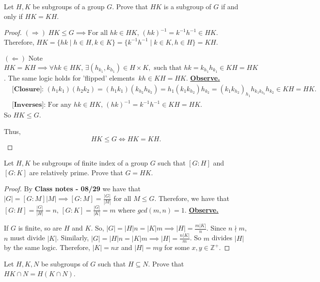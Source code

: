 \documentclass[addpoints,10pt]{exam}
\theoremstyle{plain}
\theoremstyle{definition}
\newtheorem{prob}[thm]{Problem}
\theoremstyle{plain}
\theoremstyle{plain}
\theoremstyle{definition}
\let\oldprob\prob
\let\endoldprob\endprob
\renewenvironment{prob}
  {\begin{singlespace}\oldprob}
  {\endoldprob\end{singlespace}}
\newcommand{\belowtitle}{\leavevmode\newline}
\newcommand{\Observe}{\underline{\textbf{Observe.}}}
\newcommand{\IF}{\mathbf{(\Rightarrow)}}
\newcommand{\FI}{\mathbf{(\Leftarrow)}}
\newcommand{\ZZ}{\ensuremath{\mathbb{Z}}}
\begin{document}
\begin{prob}
Let $H,K$ be subgroups of a group $G$. Prove that $HK$ is a subgroup of $G$ if and only if $HK=KH$.
\end{prob}

\begin{proof}\belowtitle
  $\IF\;HK\leq G\implies\text{For all }hk\in HK$, $(hk)^{-1}=k^{-1}h^{-1}\in HK$. Therefore, $HK=\{hk\mid h\in H, k\in K\}=\{k^{-1}h^{-1}\mid k\in K,h\in H\}=KH$.

  $\FI$ Note $HK=KH\implies \forall hk\in HK,\,\exists (h_{k_{1}},k_{h_{1}})\in H\times K, \text{ such that }hk=k_{h_{1}}h_{k_{1}}\in KH=HK$. The same logic holds for 'flipped' elements$\;\;kh\in KH=HK$. \Observe
  \begin{align*}
    &\textbf{[Closure]: } (h_{1}k_{1})(h_{2}k_{2})=(h_{1}k_{1})(k_{h_{2}}h_{k_{2}})=h_{1}(k_{1}k_{h_{2}})h_{k_{2}}=(k_{1}k_{h_{2}})_{h_{1}}h_{k_{1}k_{h_{2}}}h_{k_{2}}\in KH=HK.\\
    &\textbf{[Inverses]: }\text{For any }hk\in HK,\,(hk)^{-1}=k^{-1}h^{-1}\in KH=HK.
  \end{align*}
  So $HK\leq G$.

  Thus,
  $$HK\leq G\iff HK=KH.$$
\end{proof}
\newpage
\begin{prob}
Let $H,K$ be subgroups of finite index of a group $G$ such that $[G:H]$ and $[G:K]$ are relatively prime. Prove that $G=HK$.
\end{prob}

\begin{proof}
By \textbf{Class notes - 08/29} we have that $|G|=[G:M]|M|\implies [G:M]=\frac{|G|}{|M|}$ for all $M\leq G$. Therefore, we have that $[G:H]=\frac{|G|}{|H|}=n,\,[G:K]=\frac{|G|}{|K|}=m$ where $gcd(m,n)=1$. \Observe

If $G$ is finite, so are $H$ and $K$. So, $|G|=|H|n=|K|m\implies |H|=\frac{m|K|}{n}$. Since $n\nmid m$, $n$ must divide $|K|$. Similarly, $|G|=|H|n=|K|m\implies |H|=\frac{n|K|}{m}$. So $m$ divides $|H|$ by the same logic. Therefore, $|K|=nx$ and $|H|=my$ for some $x,y\in \ZZ^{+}$.
\end{proof}

\begin{prob}
Let $H,K,N$ be subgroups of $G$ such that $H\subseteq N$. Prove that $HK\cap N = H(K\cap N)$.
\end{prob}
\end{document}
